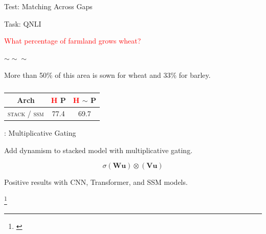 \documentclass[14pt,aspectratio=169]{beamer}
\newcommand\blfootnote[1]{%
\begingroup
\renewcommand\thefootnote{}\footnote{#1}%
\addtocounter{footnote}{-1}%
\endgroup
}
\begin{document}
\begin{frame}{Test: Matching Across Gaps}
\centerline{Task: QNLI \cite{wang2018glue}}
\vspace{0.5cm}

   
    \centerline{\textcolor{red}{What percentage of farmland grows wheat?}}
    
    \centerline{$\sim \sim \sim $}

    \centerline{\textcolor{olivegreen}{More than 50\% of this area is sown for wheat and 33\% for barley.}}
    
    \pause
    
    \begin{table}[t]
\center
    \begin{tabular}{ccc}
    \toprule
    \centering
     Arch  & \textcolor{red}{H} P &   \textcolor{red}{H} $\sim$ P \\    
    \midrule
             \textsc{stack} / \textsc{ssm} & 77.4 &  69.7\\
    \bottomrule
    \end{tabular}
    \caption{}
    \label{tab:synthetic}
\end{table}
\end{frame}



    



\begin{frame}{: Multiplicative Gating}

Add dynamism to stacked model with multiplicative gating.

$$\sigma(\mathbf{W} \mathbf{u}) \otimes (\mathbf{V} \mathbf{u})$$

Positive results with CNN, Transformer, and SSM models.


\blfootnote{\cite{dauphin2017language, shazeer2020glu, narang2021transformer}}

\end{frame}
\end{document}
